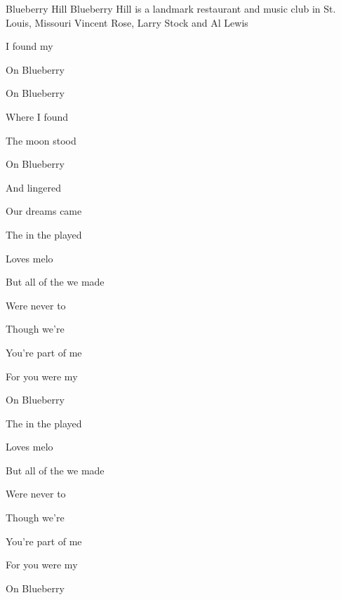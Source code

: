 \begin{SBSong}{Blueberry Hill}
  {Blueberry Hill is a landmark restaurant and music club in St. Louis, Missouri}
  {Vincent Rose, Larry Stock and Al Lewis}
  \begin{SBVerse}
	I found my 
	
	On Blueberry 
 
	On Blueberry 
	
	Where I found    
  \end{SBVerse}
  \begin{SBVerse}
	The moon stood 
	
	On Blueberry 
	
	And lingered 
	
	Our dreams came   	
  \end{SBVerse}
  \begin{SBVerse}
	The  in the  played
	
	Loves  melo
	
	But all of the  we made
	
	Were never to   
  \end{SBVerse}
  \begin{SBVerse}
	Though we're 
	
	You're part of me 
	
	For you were my  
	
	On Blueberry   
  \end{SBVerse}
  \begin{SBVerse}
	The  in the  played
	
	Loves  melo 
	
	But all of the  we made
	
	Were never to   
  \end{SBVerse}
  \CBPageBrk
  \begin{SBVerse}
	Though we're 
	
	You're part of me 
	
	For you were my  
	
	On Blueberry   
  \end{SBVerse}
\end{SBSong}